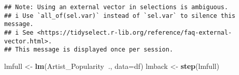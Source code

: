 \documentclass[
]{article}
\newenvironment{Shaded}{\begin{snugshade}}{\end{snugshade}}
\newcommand{\DataTypeTok}[1]{\textcolor[rgb]{0.13,0.29,0.53}{#1}}
\newcommand{\KeywordTok}[1]{\textcolor[rgb]{0.13,0.29,0.53}{\textbf{#1}}}
\newcommand{\NormalTok}[1]{#1}
\newcommand{\OperatorTok}[1]{\textcolor[rgb]{0.81,0.36,0.00}{\textbf{#1}}}
\newcommand{\StringTok}[1]{\textcolor[rgb]{0.31,0.60,0.02}{#1}}
\begin{document}
\begin{verbatim}
## Note: Using an external vector in selections is ambiguous.
## i Use `all_of(sel.var)` instead of `sel.var` to silence this message.
## i See <https://tidyselect.r-lib.org/reference/faq-external-vector.html>.
## This message is displayed once per session.
\end{verbatim}

\begin{Shaded}
\begin{Highlighting}[]
\NormalTok{lmfull <-}\StringTok{ }\KeywordTok{lm}\NormalTok{(Artist_Popularity}\OperatorTok{~}\NormalTok{., }\DataTypeTok{data=}\NormalTok{df)}
\NormalTok{lmback <-}\StringTok{ }\KeywordTok{step}\NormalTok{(lmfull)}
\end{Highlighting}
\end{Shaded}
\end{document}

